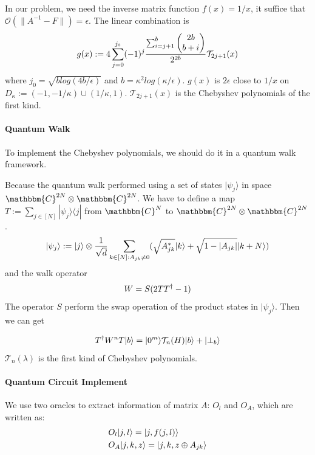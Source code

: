 \documentclass[%
 reprint,
 amsmath,amssymb,
pra,
]{revtex4-1}
\begin{document}
In our problem, we need the inverse matrix function $f(x) = 1/x$, 
it suffice that $\mathcal{O}(\lVert A^{-1}-F\rVert)=\epsilon$.
The linear combination\cite{Childs2017Quantum} is
\begin{equation}
g(x):=4\sum_{j=0}^{j_0}(-1)^j
\frac{\sum_{i=j+1}^{b}\begin{pmatrix}
2b\\b+i
\end{pmatrix}}{2^{2b}}\mathcal{T}_{2j+1}(x)\notag
\end{equation}
where $j_0=\sqrt{b log(4b/\epsilon)}$ and $b=\kappa^2log(\kappa/\epsilon)$.
$g(x)$ is $2\epsilon$ close to $1/x$ on $D_\kappa:=(-1,-1/\kappa)\cup
(1/\kappa,1)$.
$\mathcal{T}_{2j+1}(x)$ is the Chebyshev polynomials of the first kind.
\paragraph{Quantum Walk}
To implement the Chebyshev polynomials, we should do it in a quantum walk 
framework. 

Because the quantum walk performed using a set of states $|\psi_j\rangle$
in space $\mathbbm{C}^{2N}\otimes
\mathbbm{C}^{2N}$.
We have to define a map $T:=\sum_{j\in [N]}|\psi_j\rangle\langle j|$ from
$\mathbbm{C}^{N}$ to $\mathbbm{C}^{2N}\otimes\mathbbm{C}^{2N}$.
\begin{equation}
|\psi_j\rangle:=|j\rangle\otimes \frac{1}{\sqrt{d}}
\sum_{k\in [N]:A_{jk}\neq 0}(\sqrt{A^*_{jk}}|k\rangle+\sqrt{1-|A_{jk}|}|k+N
\rangle)\notag
\end{equation}
and the walk operator
\begin{equation}
W=S(2TT^\dagger-1)\notag
\end{equation}
The operator $S$ perform the swap operation of the product states in 
$|\psi_j\rangle$. Then we can get 

\begin{equation}
T^{\dagger}W^nT|b\rangle=|0^m\rangle\mathcal{T}_n(H)|b\rangle+|\bot_b\rangle\notag
\end{equation}
$\mathcal{T}_n(\lambda)$ is the first kind of Chebyshev polynomials.

\paragraph{Quantum Circuit Implement}
We use two oracles to extract information of matrix $A$: $O_l$ and $O_A$, which are written as:
\begin{align}
&O_l|j,l\rangle=|j,f(j,l)\rangle\notag\\
&O_A|j,k,z\rangle=|j,k,z\oplus A_{jk}\rangle\notag
\end{align}
\end{document}
